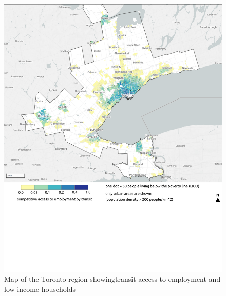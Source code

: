 \documentclass[11 pt, letterpaper]{article}
\begin{document}
{\begin{figure}[H]
	\caption{Map of the Toronto region showingtransit access to employment and low income households} 
	\label{a_van}
	\centerline{\includegraphics[width=6.5in]{figures/appendix_maps/a_tor_all.png}}
	\vspace{2mm}
\end{figure}

}
\end{document}
